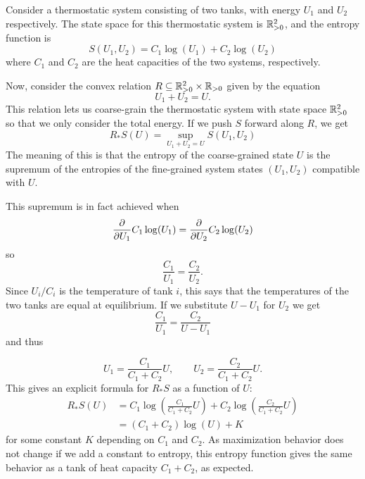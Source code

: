 \documentclass[12pt, reqno]{amsart}
\newcommand{\pos}{\real_{> 0}}
\begin{document}
\begin{example}
    Consider a thermostatic system consisting of two tanks, with energy $U_1$ and $U_2$ respectively. The state space for this thermostatic system is $\pos^2$, and the entropy function is
    \[ S(U_1,U_2) = C_1 \log(U_1) + C_2 \log(U_2) \]
    where $C_1$ and $C_2$ are the heat capacities of the two systems, respectively.
    
    Now, consider the convex relation $R \ins \pos^2 \times \pos$ given by the equation
    \[ U_1 + U_2 = U.\]
    This relation lets us coarse-grain the thermostatic system with state space $\pos^2$ so that we only consider the total energy. If we push $S$ forward along $R$, we get
    \[ R_\ast S(U) = \sup_{U_1 + U_2 = U} S(U_1, U_2) \]
    The meaning of this is that the entropy of the coarse-grained state $U$ is the supremum of the entropies of the fine-grained system states $(U_1,U_2)$ compatible with $U$.
    
    This supremum is in fact achieved when
    \[ \pdv{U_1} C_1 \log(U_1) = \pdv{U_2} C_2 \log(U_2) \]
    so
    \[ \frac{C_1}{U_1} = \frac{C_2}{U_2}. \]
    Since $U_i/C_i$ is the temperature of tank $i$, this says that the temperatures of the two tanks are equal at equilibrium. If we substitute $U - U_1$ for $U_2$ we get
    \[  \frac{C_1}{U_1} = \frac{C_2}{U - U_1} \]
    and thus

    \[ U_1 = \frac{C_1}{C_1 + C_2} U , \qquad U_2 = \frac{C_2}{C_1 + C_2} U. \]
    This gives an explicit formula for $R_\ast S$ as a function of $U$:
    \begin{align*}
    R_\ast S(U) &= C_1 \log(\frac{C_1}{C_1 + C_2} U) + C_2 \log(\frac{C_2}{C_1 + C_2}U) \\
    &= (C_1 + C_2)\log(U) + K
    \end{align*}
    for some constant $K$ depending on $C_1$ and $C_2$. As maximization behavior does not change if we add a constant to entropy, this entropy function gives the same behavior as a tank of heat capacity $C_1 + C_2$, as expected.
\end{example}
\end{document}
